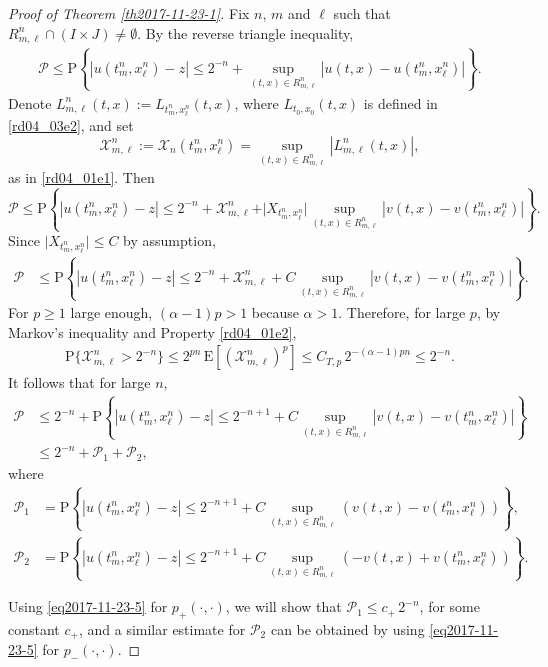 \documentclass[12pt,a4paper]{article}
\newcommand{\E}{\mathrm{E}}
\newcommand{\XX}{\mathcal{X}}
\renewcommand{\P}{\mathrm{P}}
\newcommand{\<}{\langle}
\renewcommand{\>}{\rangle}
\begin{document}
\begin{proof}[Proof of Theorem \ref{th2017-11-23-1}]
Fix $n$, $m$ and $\ell$ such that $R^n_{m,\ell} \cap ( I \times J) \neq \emptyset$. By the reverse triangle inequality, 
\begin{align}\label{rd04_03e1}
           \mathcal{P} \leq \P\left\{|u(t_m^n, x_{\ell}^n)-z| \leq 2^{-n} + \sup_{(t,x)\in R^n_{m,\ell}} |u(t,x)-u(t_m^n, x_\ell^n)|\right\}. 
 \end{align}
        Denote $L_{m, \ell}^n(t, x) := L_{t_m^n, x_\ell^n}(t, x)$, where $L_{t_0,x_0}(t, x)$ is defined in \eqref{rd04_03e2}, and set
 \[
     \XX_{m, \ell}^n := \XX_n(t_m^n, x_\ell^n) =\sup_{(t, x) \in R^n_{m,\ell}} | L_{m, \ell}^n(t, x)|, %
 \]
as in \eqref{rd04_01e1}. Then
\[
    \mathcal{P} \leq  \P\left\{|u(t_m^n, x_{\ell}^n)-z| \leq 2^{-n} + \XX_{m, \ell}^n +  \vert X_{t_m^n, x_\ell^n}\vert \sup_{(t,x)\in R^n_{m,\ell}} |v(t,x)-v(t_m^n, x_\ell^n)|\right\} .
\]
 Since $\vert X_{t_m^n, x_\ell^n}\vert \leq  C$ by assumption, 
 \begin{align*}
 \mathcal{P} &\leq  \P\left\{|u(t_m^n, x_{\ell}^n)-z| \leq 2^{-n} + \XX_{m, \ell}^n + C \sup_{(t,x)\in R^n_{m,\ell}} |v(t,x)-v(t_m^n, x_\ell^n)|\right\} .
 \end{align*}
 For $p \geq 1$ large enough, $(\alpha - 1) p > 1$ because  $\alpha > 1$. Therefore, for large $p$, by Markov's inequality and Property \eqref{rd04_01e2}, 
 \begin{align*}
 \P\{\XX_{m, \ell}^n > 2^{-n} \} \leq 2^{p n}\, \E\left[(\XX_{m, \ell}^n)^p \right] \leq C_{T, p}\, 2^{-(\alpha  - 1) p n} \leq 2^{-n}.
 \end{align*}
 It follows that for large $n$,
  \begin{align}\nonumber
     \mathcal{P}  &\leq 2^{-n} + \P\left\{|u(t_m^n, x_{\ell}^n)-z| \leq 2^{-n+1} + C \sup_{(t,x)\in R^n_{m,\ell}} |v(t,x)-v(t_m^n, x_\ell^n)|\right\} \\
     &\leq 2^{-n} + \mathcal{P}_1+ \mathcal{P}_2,
 \label{rd07_26e1}
 \end{align}
 where
 \begin{align*}
\mathcal{P}_1&=   \P\left\{|u(t_m^n, x_{\ell}^n)-z| \leq 2^{-n+1} + C \sup_{(t,x)\in R^n_{m,\ell}} (v(t\,,x)-v(t_m^n, x_\ell^n))\right\},\\
\mathcal{P}_2&=   \P\left\{|u(t_m^n, x_{\ell}^n)-z| \leq 2^{-n+1}  + C \sup_{(t,x)\in R^n_{m,\ell}} (-v(t\,,x)+v(t_m^n, x_\ell^n))\right\}.
\end{align*} 

Using \eqref{eq2017-11-23-5} for $p_{+}(\cdot, \cdot)$, we will show that %
$\mathcal{P}_1 \leq c_+\, 2^{-n}$, for some constant $c_+$, and a similar estimate for $\mathcal{P}_2$ can be obtained by using \eqref{eq2017-11-23-5} for $p_{-}(\cdot, \cdot)$.   




\end{proof}
\end{document}
